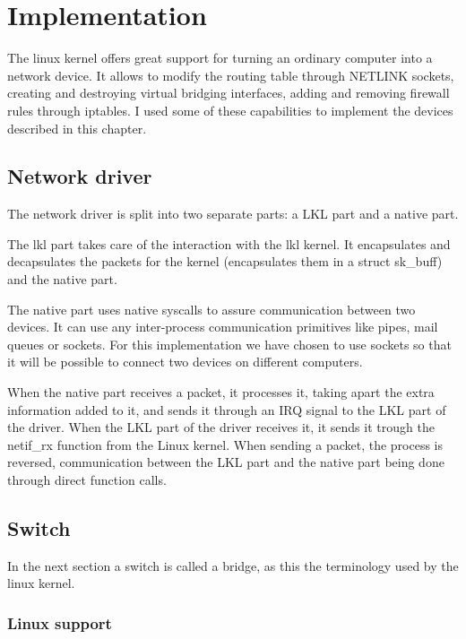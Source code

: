\chapter{Implementation}
\label{chapter:impl}

The linux kernel offers great support for turning an ordinary
computer into a network device. It allows to modify the routing 
table through NETLINK sockets, creating and destroying virtual 
bridging interfaces, adding and removing firewall rules through 
iptables. I used some of these capabilities to implement the 
devices described in this chapter.

\section{Network driver}
\label{sec:net-driver}


The network driver is split into two separate parts: a LKL part 
and a native part.

The lkl part takes care of the interaction with the lkl kernel.
It encapsulates and decapsulates the packets for the kernel
(encapsulates them in a struct sk_buff) and the native part.

The native part uses native syscalls to assure communication 
between two devices. It can use any inter-process communication 
primitives like pipes, mail queues or sockets.
For this implementation we have chosen to use 
sockets so that it will be possible to connect two devices 
on different computers.

When the native part receives a packet, it processes it, taking apart
the extra information added to it,  and sends it through an IRQ signal
to the LKL part of the driver. When the LKL part of the driver receives it,
it sends it trough the netif_rx function from the Linux kernel. When sending
a packet, the process is reversed, communication between the LKL part and the
native part being done through direct function calls.

\section{Switch}
\label{sec:switch-impl}

In the next section a switch is called a bridge, as this
the terminology used by the linux kernel.

\subsection{Linux support}
\label{sub-sec:switch-lin}


